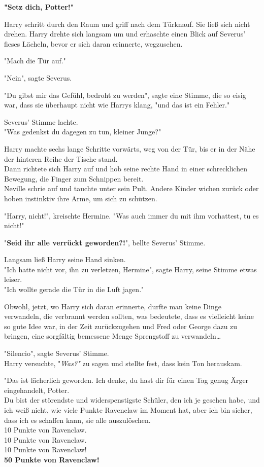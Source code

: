 {\textbf{"Setz dich, Potter!"}

Harry schritt durch den Raum und griff nach dem Türknauf. Sie ließ sich nicht drehen. Harry drehte sich langsam um und erhaschte einen Blick auf Severus' fieses Lächeln, bevor er sich daran erinnerte, wegzusehen.

"Mach die Tür auf."

"Nein", sagte Severus.

"Du gibst mir das Gefühl, bedroht zu werden", sagte eine Stimme, die so eisig war, dass sie überhaupt nicht wie Harrys klang, "und das ist ein Fehler."

Severus' Stimme lachte.\\ "Was gedenkst du dagegen zu tun, kleiner Junge?"

Harry machte sechs lange Schritte vorwärts, weg von der Tür, bis er in der Nähe der hinteren Reihe der Tische stand.\\ Dann richtete sich Harry auf und hob seine rechte Hand in einer schrecklichen Bewegung, die Finger zum Schnippen bereit.\\ Neville schrie auf und tauchte unter sein Pult. Andere Kinder wichen zurück oder hoben instinktiv ihre Arme, um sich zu schützen.

"Harry, nicht!", kreischte Hermine. "Was auch immer du mit ihm vorhattest, tu es nicht!"

"\textbf{Seid ihr alle verrückt geworden?!}", bellte Severus' Stimme.

Langsam ließ Harry seine Hand sinken.\\ "Ich hatte nicht vor, ihn zu verletzen, Hermine", sagte Harry, seine Stimme etwas leiser.\\ "Ich wollte gerade die Tür in die Luft jagen."

Obwohl, jetzt, wo Harry sich daran erinnerte, durfte man keine Dinge verwandeln, die verbrannt werden sollten, was bedeutete, dass es vielleicht keine so gute Idee war, in der Zeit zurückzugehen und Fred oder George dazu zu bringen, eine sorgfältig bemessene Menge Sprengstoff zu verwandeln…

"Silencio", sagte Severus' Stimme.\\ Harry versuchte, "\emph{Was?"} zu sagen und stellte fest, dass kein Ton herauskam.

"Das ist lächerlich geworden. Ich denke, du hast dir für einen Tag genug Ärger eingehandelt, Potter.\\ Du bist der störendste und widerspenstigste Schüler, den ich je gesehen habe, und ich weiß nicht, wie viele Punkte Ravenclaw im Moment hat, aber ich bin sicher, dass ich es schaffen kann, sie alle auszulöschen.\\ 10 Punkte von Ravenclaw.\\ 10 Punkte von Ravenclaw.\\ 10 Punkte von Ravenclaw!\\ \textbf{50 Punkte von Ravenclaw!}

}
